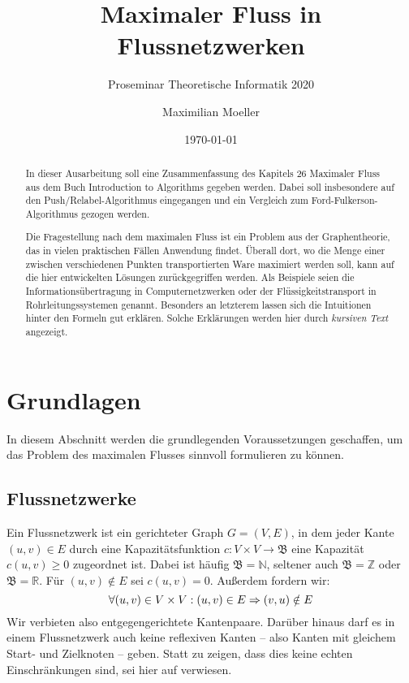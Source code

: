 \documentclass[12pt,a4paper,titlepage,onecolumn,ngerman,draft]{scrartcl}
\author{Maximilian Moeller}
\title{Maximaler Fluss in Flussnetzwerken}
\subtitle{Proseminar Theoretische Informatik 2020}
\date{\today}
\newcommand{\ff}{Ford-Fulkerson}
\newcommand{\pr}{Push/Relabel}
\begin{document}
\maketitle
\nocite{Cormen09}

\tableofcontents

\begin{abstract}
In dieser Ausarbeitung soll eine Zusammenfassung des Kapitels 26 \glqq Maximaler Fluss\grqq{} aus dem Buch \glqq Introduction to Algorithms \grqq{} \citep{Cormen09} gegeben werden. 
Dabei soll insbesondere auf den \pr -Algorithmus eingegangen und ein Vergleich zum \ff -Algorithmus gezogen werden.

Die Fragestellung nach dem maximalen Fluss ist ein Problem aus der Graphentheorie, das
in vielen praktischen Fällen Anwendung findet. 
Überall dort, wo die Menge einer zwischen verschiedenen Punkten transportierten Ware maximiert werden soll, kann auf die hier entwickelten Lösungen zurückgegriffen werden. 
Als Beispiele seien die Informationsübertragung in Computernetzwerken oder der Flüssigkeitstransport in Rohrleitungssystemen genannt. 
Besonders an letzterem lassen sich die Intuitionen hinter den Formeln gut erklären. Solche Erklärungen werden hier durch \textit{kursiven Text} angezeigt.
\end{abstract}

\section{Grundlagen}
In diesem Abschnitt werden die grundlegenden Voraussetzungen geschaffen, um das Problem des maximalen Flusses sinnvoll formulieren zu können.

\subsection{Flussnetzwerke}
Ein Flussnetzwerk ist ein gerichteter Graph $G = (V,E)$, in dem jeder Kante $(u,v) \in E$ durch eine Kapazitätsfunktion $c: V\times V\to\mathfrak{B}$ eine Kapazität $c(u,v) \geq 0$ zugeordnet ist.
Dabei ist häufig $\mathfrak{B} = \mathbb{N}$, seltener auch $\mathfrak{B} = \mathbb{Z}$ oder $\mathfrak{B} = \mathbb{R}$.
Für $(u,v) \notin E$ sei $c(u,v) = 0$.
Außerdem fordern wir:
\begin{equation} \label{no_parallel}
\forall (u,v)\in V\times V: (u,v)\in E \Rightarrow (v,u)\notin E\\
\end{equation}
Wir verbieten also entgegengerichtete Kantenpaare.
Darüber hinaus darf es in einem Flussnetzwerk auch keine reflexiven Kanten -- also Kanten mit gleichem Start- und Zielknoten -- geben.
Statt zu zeigen, dass dies keine echten Einschränkungen sind, sei hier auf \cite[Kapitel, 26]{Cormen09} verwiesen.
\end{document}
